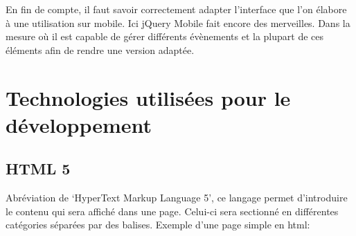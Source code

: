 \documentclass[letterpaper,10pt,french]{sphinxmanual}
\begin{document}
En fin de compte, il faut savoir correctement adapter l'interface que l'on élabore
à une utilisation sur mobile. Ici jQuery Mobile fait encore des merveilles. Dans
la mesure où il est capable de gérer différents évènements et la plupart de ces
éléments afin de rendre une version adaptée.


\chapter{Technologies utilisées pour le développement}
\label{technologie::doc}\label{technologie:technologies-utilisees-pour-le-developpement}

\section{HTML 5}
\label{technologie:html-5}
Abréviation de `HyperText Markup Language 5', ce langage permet d'introduire le
contenu qui sera affiché dans une page. Celui-ci sera sectionné en différentes
catégories séparées par des balises. Exemple d'une page simple en html:
\end{document}
